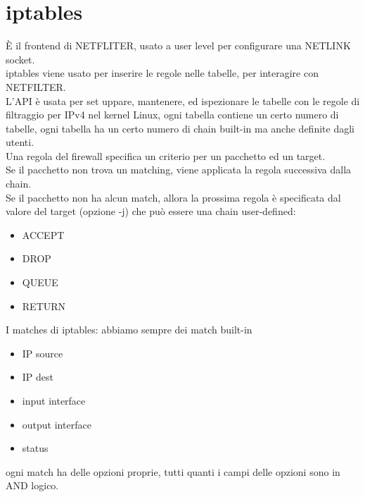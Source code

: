 \documentclass[12pt, oneside]{extbook} %
\begin{document}
\section{iptables}
È il frontend di NETFLITER, usato a user level per configurare una NETLINK socket.
\\iptables viene usato per inserire le regole nelle tabelle, per interagire con NETFILTER.
\\L'API è usata per set uppare, mantenere, ed ispezionare le tabelle con le regole di filtraggio per IPv4 nel kernel Linux, ogni tabella contiene un certo numero di tabelle, ogni tabella ha un certo numero di chain built-in ma anche definite dagli utenti.
\\Una regola del firewall specifica un criterio per un pacchetto ed un target.
\\Se il pacchetto non trova un matching, viene applicata la regola successiva dalla chain.
\\Se il pacchetto non ha alcun match, allora la prossima regola è specificata dal valore del target (opzione -j) che può essere una chain user-defined:
\begin{itemize}
\item ACCEPT
\item DROP
\item QUEUE
\item RETURN
\end{itemize}
I matches di iptables: abbiamo sempre dei match built-in
\begin{itemize}
\item IP source
\item IP dest
\item input interface
\item output interface
\item status
\end{itemize}
ogni match ha delle opzioni proprie, tutti quanti i campi delle opzioni sono in AND logico.
\end{document}

